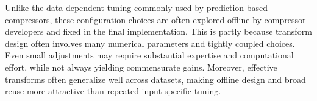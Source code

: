 Unlike the data-dependent tuning commonly used by prediction-based compressors, these configuration choices are often explored offline by compressor developers and fixed in the final implementation. This is partly because transform design often involves many numerical parameters and tightly coupled choices. Even small adjustments may require substantial expertise and computational effort, while not always yielding commensurate gains. Moreover, effective transforms often generalize well across datasets, making offline design and broad reuse more attractive than repeated input-specific tuning.
